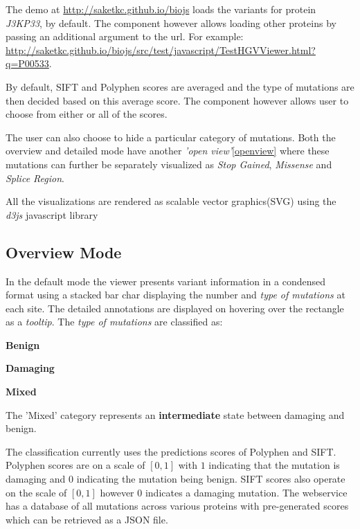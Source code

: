 \documentclass[twoside]{article}
\begin{document}
\begin{multicols}{2}
The demo at \url{http://saketkc.github.io/biojs} loads the variants for protein \textit{J3KP33}, by default. The component however allows loading other proteins by passing an additional argument to the url. For example: \url{http://saketkc.github.io/biojs/src/test/javascript/TestHGVViewer.html?q=P00533}.

By default, SIFT and Polyphen scores are averaged and the type of mutations are then decided based on this average score. The component however allows user to choose from either or all of the scores.

The user can also choose to hide a particular category of mutations. Both the overview and detailed mode have another \textit{'open view'}\ref{openview} where these mutations can further be separately visualized as \textit{Stop Gained}, \textit{Missense} and \textit{Splice Region}.

All the visualizations are rendered as scalable vector graphics(SVG) using the \textit{d3js}\cite{d3js} javascript library


\subsection{Overview Mode}
In the default mode the viewer presents variant information in a condensed format using a stacked bar char displaying the number and \textit{type of mutations} at each site. The detailed annotations are displayed on hovering over the rectangle as a \textit{tooltip}.
The \textit{type of mutations} are classified as:
\begin{compactitem}
\item \textbf{Benign} %
\item \textbf{Damaging} %
\item \textbf{Mixed}
\end{compactitem}

The 'Mixed' category represents an \textbf{intermediate} state between damaging and benign.


The classification currently uses the predictions scores of Polyphen\cite{Ramensky2002} and SIFT\cite{Kumar2009}. Polyphen scores are on a scale of $[0,1]$ with $1$ indicating that the mutation is damaging and $0$ indicating the mutation being benign. SIFT scores also operate on the scale of $[0,1]$ however $0$ indicates a damaging mutation.
The webservice has a database of all mutations across various proteins with pre-generated scores which can be retrieved as a JSON file.


\end{multicols}
\end{document}
